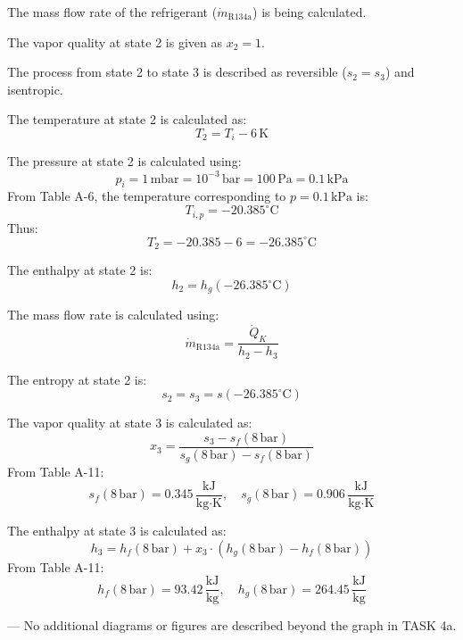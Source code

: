 The mass flow rate of the refrigerant (\( \dot{m}_{\text{R134a}} \)) is being calculated.  

The vapor quality at state 2 is given as \( x_2 = 1 \).  

The process from state 2 to state 3 is described as reversible (\( s_2 = s_3 \)) and isentropic.  

The temperature at state 2 is calculated as:  
\[
T_2 = T_i - 6 \, \text{K}
\]  

The pressure at state 2 is calculated using:  
\[
p_i = 1 \, \text{mbar} = 10^{-3} \, \text{bar} = 100 \, \text{Pa} = 0.1 \, \text{kPa}
\]  
From Table A-6, the temperature corresponding to \( p = 0.1 \, \text{kPa} \) is:  
\[
T_{i,p} = -20.385^\circ \text{C}
\]  
Thus:  
\[
T_2 = -20.385 - 6 = -26.385^\circ \text{C}
\]  

The enthalpy at state 2 is:  
\[
h_2 = h_g(-26.385^\circ \text{C})
\]  

The mass flow rate is calculated using:  
\[
\dot{m}_{\text{R134a}} = \frac{\dot{Q}_K}{h_2 - h_3}
\]  

The entropy at state 2 is:  
\[
s_2 = s_3 = s(-26.385^\circ \text{C})
\]  

The vapor quality at state 3 is calculated as:  
\[
x_3 = \frac{s_3 - s_f(8 \, \text{bar})}{s_g(8 \, \text{bar}) - s_f(8 \, \text{bar})}
\]  
From Table A-11:  
\[
s_f(8 \, \text{bar}) = 0.345 \, \frac{\text{kJ}}{\text{kg·K}}, \quad s_g(8 \, \text{bar}) = 0.906 \, \frac{\text{kJ}}{\text{kg·K}}
\]  

The enthalpy at state 3 is calculated as:  
\[
h_3 = h_f(8 \, \text{bar}) + x_3 \cdot \left(h_g(8 \, \text{bar}) - h_f(8 \, \text{bar})\right)
\]  
From Table A-11:  
\[
h_f(8 \, \text{bar}) = 93.42 \, \frac{\text{kJ}}{\text{kg}}, \quad h_g(8 \, \text{bar}) = 264.45 \, \frac{\text{kJ}}{\text{kg}}
\]  

---  
No additional diagrams or figures are described beyond the graph in TASK 4a.